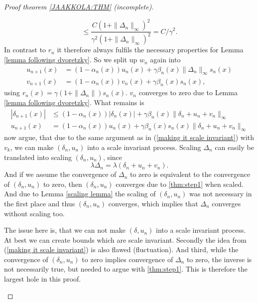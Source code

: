 \begin{proof}[Proof theorem \ref{JAAKKOLA:THM} (incomplete)]
\begin{enumerate}[label= Step \arabic*:, ref= Step \arabic*, leftmargin=0pt]
\[        \le \frac{C(1+\|\Delta_n\|_\infty)^2 }{\gamma^2(1+\|\Delta_n\|_\infty)^2}
        =C/\gamma^2.
    \]
    In contrast to \(r_n\) it therefore always fulfils the necessary properties for Lemma \ref{lemma following dvoretzky}. So we split up \(w_n\) again into
    \begin{align*}
        u_{n+1}(x)
        &=(1-\alpha_n(x))u_n(x) + \gamma\beta_n(x)\|\Delta_n\|_\infty s_n(x)\\ 
        v_{n+1}(x)
        &=(1-\alpha_n(x))v_n(x) +\gamma\beta_n(x) s_n(x),
    \end{align*}
    using \(r_n(x)=\gamma(1+\|\Delta_n\|)s_n(x)\). \(v_n\) converges to zero due to Lemma \ref{lemma following dvoretzky}. What remains is 
    \begin{align*}
        |\delta_{n+1}(x)| 
        &\le (1-\alpha_n(x))|\delta_n(x)|+\gamma \beta_n(x)\|\delta_n+u_n+v_n\|_\infty\\
        u_{n+1}(x)
        &= (1-\alpha_n(x))u_n(x) +\gamma \beta_n(x)s_n(x)\|\delta_n+u_n+v_n\|_\infty
    \end{align*}
    \citeauthor{jaakkolaConvergenceStochasticIterative1994a} now argue, that due to the same argument as in (\ref{making it scale invariant}) with \(v_k\), we can make \((\delta_n, u_n)\) into a scale invariant process.
    Scaling \(\Delta_n\) can easily be translated into scaling \((\delta_n, u_n)\), since
    \[
        \lambda \Delta_n = \lambda (\delta_n + u_n + v_n).
    \]
    And if we assume the convergence of \(\Delta_n\) to zero is equivalent to the convergence of \((\delta_n, u_n)\) to zero, then \((\delta_n, u_n)\) converges due to \ref{thm:step1} when scaled. And due to Lemma \ref{scaling lemma} the scaling of \((\delta_n, u_n)\) was not necessary in the first place and thus \((\delta_n, u_n)\) converges, which implies that \(\Delta_n\) converges without scaling too. 
    
    The issue here is, that we can not make \((\delta, u_n)\) into a scale invariant process. At best we can create bounds which are scale invariant. Secondly the idea from (\ref{making it scale invariant}) is also flawed (fluctuation). And third,  while the convergence of \((\delta_n, u_n)\) to zero implies convergence of \(\Delta_n\) to zero, the inverse is not necessarily true, but needed to argue with \ref{thm:step1}. This is therefore the largest hole in this proof. 
    

\end{enumerate}
\end{proof}
